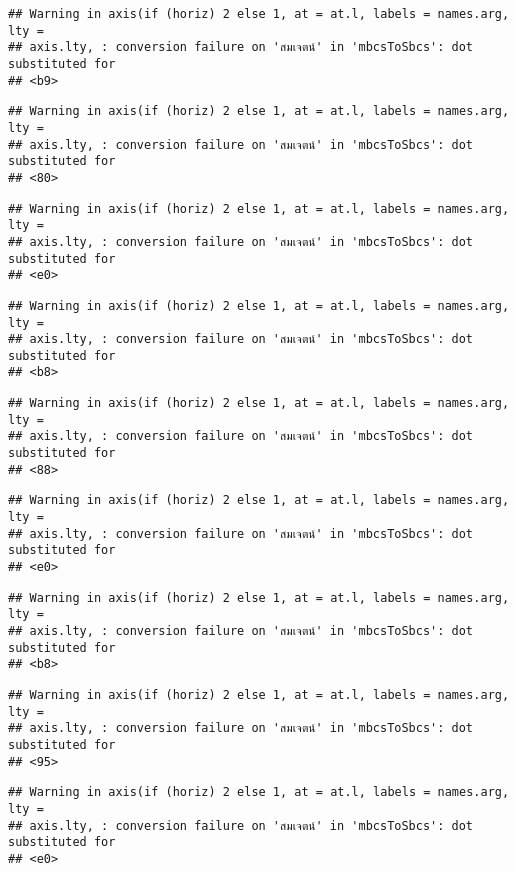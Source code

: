 \documentclass[
]{article}
\begin{document}
\begin{verbatim}
## Warning in axis(if (horiz) 2 else 1, at = at.l, labels = names.arg, lty =
## axis.lty, : conversion failure on 'สมเจตน์' in 'mbcsToSbcs': dot substituted for
## <b9>
\end{verbatim}

\begin{verbatim}
## Warning in axis(if (horiz) 2 else 1, at = at.l, labels = names.arg, lty =
## axis.lty, : conversion failure on 'สมเจตน์' in 'mbcsToSbcs': dot substituted for
## <80>
\end{verbatim}

\begin{verbatim}
## Warning in axis(if (horiz) 2 else 1, at = at.l, labels = names.arg, lty =
## axis.lty, : conversion failure on 'สมเจตน์' in 'mbcsToSbcs': dot substituted for
## <e0>
\end{verbatim}

\begin{verbatim}
## Warning in axis(if (horiz) 2 else 1, at = at.l, labels = names.arg, lty =
## axis.lty, : conversion failure on 'สมเจตน์' in 'mbcsToSbcs': dot substituted for
## <b8>
\end{verbatim}

\begin{verbatim}
## Warning in axis(if (horiz) 2 else 1, at = at.l, labels = names.arg, lty =
## axis.lty, : conversion failure on 'สมเจตน์' in 'mbcsToSbcs': dot substituted for
## <88>
\end{verbatim}

\begin{verbatim}
## Warning in axis(if (horiz) 2 else 1, at = at.l, labels = names.arg, lty =
## axis.lty, : conversion failure on 'สมเจตน์' in 'mbcsToSbcs': dot substituted for
## <e0>
\end{verbatim}

\begin{verbatim}
## Warning in axis(if (horiz) 2 else 1, at = at.l, labels = names.arg, lty =
## axis.lty, : conversion failure on 'สมเจตน์' in 'mbcsToSbcs': dot substituted for
## <b8>
\end{verbatim}

\begin{verbatim}
## Warning in axis(if (horiz) 2 else 1, at = at.l, labels = names.arg, lty =
## axis.lty, : conversion failure on 'สมเจตน์' in 'mbcsToSbcs': dot substituted for
## <95>
\end{verbatim}

\begin{verbatim}
## Warning in axis(if (horiz) 2 else 1, at = at.l, labels = names.arg, lty =
## axis.lty, : conversion failure on 'สมเจตน์' in 'mbcsToSbcs': dot substituted for
## <e0>
\end{verbatim}
\end{document}

